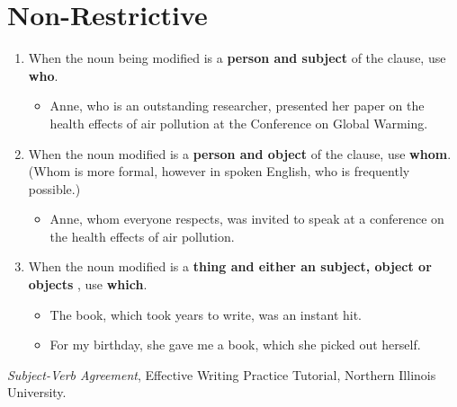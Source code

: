 \documentclass[12pt]{article} %
\begin{document}
\newpage

\section{Non-Restrictive}
\begin{enumerate}
  \item When the noun being modified is a \textbf{person and subject} of the clause, use \textbf{who}.
  \begin{itemize}
    \item Anne, who is an outstanding researcher, presented her paper on the health effects of air pollution at the Conference on Global Warming.
  \end{itemize}

  \item When the noun modified is a \textbf{person and object} of the clause, use \textbf{whom}.\\ (Whom is more formal, however
   in spoken English, who is frequently possible.)
   \begin{itemize}
     \item Anne, whom everyone respects, was invited to speak at a conference on the health effects of air pollution.
   \end{itemize}

   \item When the noun modified is a \textbf{thing and either an subject, object or objects} , use \textbf{which}.
   \begin{itemize}
     \item The book, which took years to write, was an instant hit.
     \item For my birthday, she gave me a book, which she picked out herself.
   \end{itemize}
\end{enumerate}


\vspace*{2cm}




\textit{Subject-Verb Agreement}, Effective Writing Practice Tutorial, Northern Illinois University.\\
\end{document}
